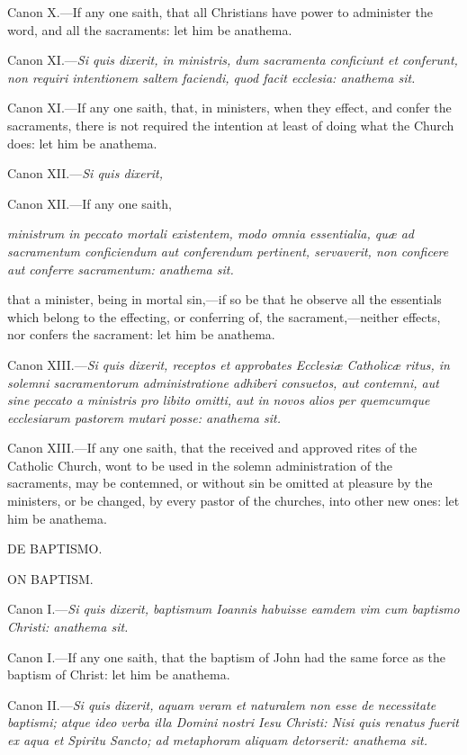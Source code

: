 Canon X.—If any one saith, that all Christians have power to administer the word, and all the sacraments: let him be anathema.

Canon XI.—\emph{Si quis dixerit, in ministris, dum sacramenta conficiunt et conferunt, non requiri intentionem saltem faciendi, quod facit ecclesia: anathema sit.}

Canon XI.—If any one saith, that, in ministers, when they effect, and confer the sacraments, there is not required the intention at least of doing what the Church does: let him be anathema.

Canon XII.—\emph{Si quis dixerit,}

Canon XII.—If any one saith,

\emph{ministrum in peccato mortali existentem, modo omnia essentialia, quæ ad sacramentum conficiendum aut conferendum pertinent, servaverit, non conficere aut conferre sacramentum: anathema sit.}

that a minister, being in mortal sin,—if so be that he observe all the essentials which belong to the effecting, or conferring of, the sacrament,—neither effects, nor confers the sacrament: let him be anathema.

Canon XIII.—\emph{Si quis dixerit, receptos et approbates Ecclesiæ Catholicæ ritus, in solemni sacramentorum administratione adhiberi consuetos, aut contemni, aut sine peccato a ministris pro libito omitti, aut in novos alios per quemcumque ecclesiarum pastorem mutari posse: anathema sit.}

Canon XIII.—If any one saith, that the received and approved rites of the Catholic Church, wont to be used in the solemn administration of the sacraments, may be contemned, or without sin be omitted at pleasure by the ministers, or be changed, by every pastor of the churches, into other new ones: let him be anathema.

DE BAPTISMO.

ON BAPTISM.

Canon I.—\emph{Si quis dixerit, baptismum Ioannis habuisse eamdem vim cum baptismo Christi: anathema sit.}

Canon I.—If any one saith, that the baptism of John had the same force as the baptism of Christ: let him be anathema.

Canon II.—\emph{Si quis dixerit, aquam veram et naturalem non esse de necessitate baptismi; atque ideo verba illa Domini nostri Iesu Christi: Nisi quis renatus fuerit ex aqua et Spiritu Sancto; ad metaphoram aliquam detorserit: anathema sit.}


